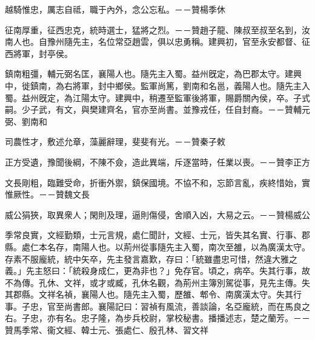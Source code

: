 \begin{pinyinscope}
越騎惟忠，厲志自祗，職于內外，念公忘私。－－贊楊季休

征南厚重，征西忠克，統時選士，猛將之烈。－－贊趙子龍、陳叔至叔至名到，汝南人也。自豫州隨先主，名位常亞趙雲，俱以忠勇稱。建興初，官至永安都督、征西將軍，封亭侯。

鎮南粗彊，輔元弼名匡，襄陽人也。隨先主入蜀。益州旣定，為巴郡太守。建興中，徙鎮南，為右將軍，封中鄉侯。監軍尚篤，劉南和名邕，義陽人也。隨先主入蜀。益州旣定，為江陽太守。建興中，稍遷至監軍後將軍，賜爵關內侯，卒。子式嗣。少子武，有文，與樊建齊名，官亦至尚書。並豫戎任，任自封裔。－－贊輔元弼、劉南和

司農性才，敷述允章，藻麗辭理，斐斐有光。－－贊秦子敕

正方受遺，豫聞後綱，不陳不僉，造此異端，斥逐當時，任業以喪。－－贊李正方

文長剛粗，臨難受命，折衝外禦，鎮保國境。不協不和，忘節言亂，疾終惜始，實惟厥性。－－贊魏文長

威公狷狹，取異衆人；閑則及理，逼則傷侵，舍順入凶，大易之云。－－贊楊威公

季常良實，文經勤類，士元言規，處仁聞計，文經、士元，皆失其名實、行事、郡縣。處仁本名存，南陽人也。以荊州從事隨先主入蜀，南次至雒，以為廣漢太守。存素不服龐統，統中矢卒，先主發言嘉歎，存曰：「統雖盡忠可惜，然違大雅之義。」先主怒曰：「統殺身成仁，更為非也？」免存官。頃之，病卒。失其行事，故不為傳。孔休、文祥，或才或臧，孔休名觀，為荊州主簿別駕從事，見先主傳。失其郡縣。文祥名禎，襄陽人也。隨先主入蜀，歷雒、郫令、南廣漢太守。失其行事。子忠，官至尚書郎。襄陽記曰：習禎有風流，善談論，名亞龐統，而在馬良之右。子忠，亦有名。忠子隆，為步兵校尉，掌校秘書。播播述志，楚之蘭芳。－－贊馬季常、衞文經、韓士元、張處仁、殷孔林、習文祥


\end{pinyinscope}
